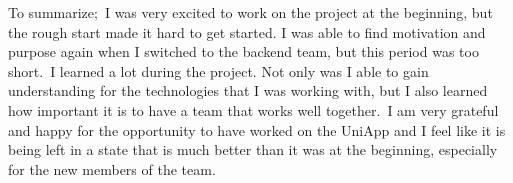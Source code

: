 \documentclass[sf-font,usefira,english]{uulm/sp/article}
\begin{document}
To summarize;\
I was very excited to work on the project at the beginning,
but the rough start made it hard to get started.
I was able to find motivation and purpose again when I switched to the backend team,
but this period was too short.\
I learned a lot during the project.
Not only was I able to gain understanding for the technologies that I was working with,
but I also learned how important it is to have a team that works well together.\
I am very grateful and happy for the opportunity to have worked on the UniApp
and I feel like it is being left in a state that is much better than it was at the beginning,
especially for the new members of the team.\\
\end{document}
